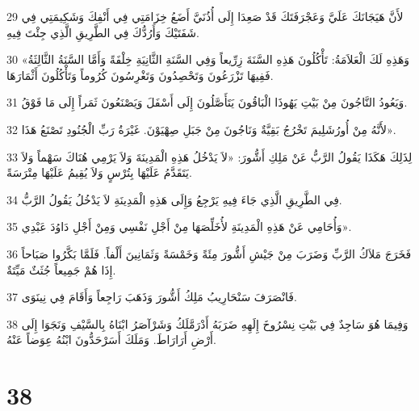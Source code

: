 \par 29 لأَنَّ هَيَجَانَكَ عَلَيَّ وَعَجْرَفَتَكَ قَدْ صَعِدَا إِلَى أُذُنَيَّ أَضَعُ خِزَامَتِي فِي أَنْفِكَ وَشَكِيمَتِي فِي شَفَتَيْكَ وَأَرُدُّكَ فِي الطَّرِيقِ الَّذِي جِئْتَ فِيهِ.
\par 30 «وَهَذِهِ لَكَ الْعَلاَمَةُ: تَأْكُلُونَ هَذِهِ السَّنَةَ زِرِّيعاً وَفِي السَّنَةِ الثَّانِيَةِ خِلْفَةً وَأَمَّا السَّنَةُ الثَّالِثَةُ فَفِيهَا تَزْرَعُونَ وَتَحْصِدُونَ وَتَغْرِسُونَ كُرُوماً وَتَأْكُلُونَ أَثْمَارَهَا.
\par 31 وَيَعُودُ النَّاجُونَ مِنْ بَيْتِ يَهُوذَا الْبَاقُونَ يَتَأَصَّلُونَ إِلَى أَسْفَلَ وَيَصْنَعُونَ ثَمَراً إِلَى مَا فَوْقُ.
\par 32 لأَنَّهُ مِنْ أُورُشَلِيمَ تَخْرُجُ بَقِيَّةٌ وَنَاجُونَ مِنْ جَبَلِ صِهْيَوْنَ. غَيْرَةُ رَبِّ الْجُنُودِ تَصْنَعُ هَذَا».
\par 33 لِذَلِكَ هَكَذَا يَقُولُ الرَّبُّ عَنْ مَلِكِ أَشُّورَ: «لاَ يَدْخُلُ هَذِهِ الْمَدِينَةَ وَلاَ يَرْمِي هُنَاكَ سَهْماً وَلاَ يَتَقَدَّمُ عَلَيْهَا بِتُرْسٍ وَلاَ يُقِيمُ عَلَيْهَا مِتْرَسَةً.
\par 34 فِي الطَّرِيقِ الَّذِي جَاءَ فِيهِ يَرْجِعُ وَإِلَى هَذِهِ الْمَدِينَةِ لاَ يَدْخُلُ يَقُولُ الرَّبُّ.
\par 35 وَأُحَامِي عَنْ هَذِهِ الْمَدِينَةِ لأُخَلِّصَهَا مِنْ أَجْلِ نَفْسِي وَمِنْ أَجْلِ دَاوُدَ عَبْدِي».
\par 36 فَخَرَجَ مَلاَكُ الرَّبِّ وَضَرَبَ مِنْ جَيْشِ أَشُّورَ مِئَةً وَخَمْسَةً وَثَمَانِينَ أَلْفاً. فَلَمَّا بَكَّرُوا صَبَاحاً إِذَا هُمْ جَمِيعاً جُثَثٌ مَيِّتَةٌ.
\par 37 فَانْصَرَفَ سَنْحَارِيبُ مَلِكُ أَشُّورَ وَذَهَبَ رَاجِعاً وَأَقَامَ فِي نِينَوَى.
\par 38 وَفِيمَا هُوَ سَاجِدٌ فِي بَيْتِ نِسْرُوخَ إِلَهِهِ ضَرَبَهُ أَدْرَمَّلَكُ وَشَرْآصَرُ ابْنَاهُ بِالسَّيْفِ وَنَجَوَا إِلَى أَرْضِ أَرَارَاطَ. وَمَلَكَ أَسَرْحَدُّونَ ابْنُهُ عِوَضاً عَنْهُ.

\chapter{38}

